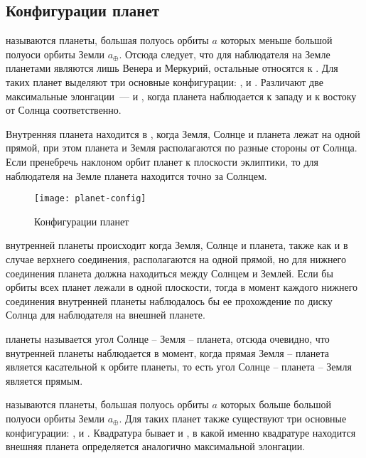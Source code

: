\subsection{Конфигурации планет}
 называются планеты, большая полуось орбиты 
$a$ которых меньше большой полуоси орбиты Земли $a_\oplus$. Отсюда следует, что для наблюдателя на Земле  планетами являются лишь Венера и Меркурий, остальные относятся к . Для таких планет выделяют три основные конфигурации: ,  и . Различают две максимальные элонгации~---  и , когда планета наблюдается к западу и к востоку от Солнца соответственно.

Внутренняя планета находится в , когда Земля, Солнце и планета лежат на одной прямой, при этом планета и Земля располагаются по разные стороны от Солнца. Если пренебречь наклоном орбит планет к плоскости эклиптики, то для наблюдателя на Земле планета находится точно за Солнцем.

\vspace{-1.2pc}
\begin{figure}[h!]
	\centering
	\texttt{[image: planet-config]}
	\caption{Конфигурации планет}
\end{figure}
\vspace{-.3pc}
 внутренней планеты происходит когда Земля, Солнце и планета, также как и в случае верхнего соединения, располагаются на одной прямой, но для нижнего соединения планета должна находиться между Солнцем и Землей. Если бы орбиты всех планет лежали в одной плоскости, тогда в момент каждого нижнего соединения внутренней планеты наблюдалось бы ее прохождение по диску Солнца для наблюдателя на внешней планете.

 планеты называется угол Солнце -- Земля -- планета, отсюда очевидно, что  внутренней планеты наблюдается в момент, когда прямая Земля -- планета является касательной к орбите планеты, то есть угол Солнце -- планета -- Земля является прямым.

 называются планеты, большая полуось орбиты $a$ которых больше большой полуоси орбиты Земли $a_\oplus$. Для таких планет также существуют три основные конфигурации: ,  и . Квадратура бывает  и , в какой именно квадратуре находится внешняя планета определяется аналогично максимальной элонгации.


